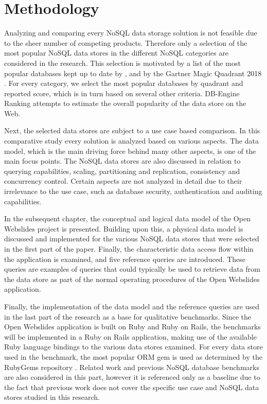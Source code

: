 
\chapter{Methodology}
\label{ch:methodology}

Analyzing and comparing every NoSQL data storage solution is not feasible due to the sheer number of competing products.
Therefore only a selection of the most popular NoSQL data stores in the different NoSQL categories are considered in the research.
This selection is motivated by a list of the most popular databases kept up to date by \textcite{DBEngine2018}, and by the Gartner Magic Quadrant 2018 \autocite{Gartner2018}.
For every category, we select the most popular databases by quadrant and reported score, which is in turn based on several other criteria.
DB-Engine Ranking attempts to estimate the overall popularity of the data store on the Web.

Next, the selected data stores are subject to a use case based comparison.
In this comparative study every solution is analyzed based on various aspects.
The data model, which is the main driving force behind many other aspects, is one of the main focus points.
The NoSQL data stores are also discussed in relation to querying capabilities, scaling, partitioning and replication, consistency and concurrency control.
Certain aspects are not analyzed in detail due to their irrelevance to the use case, such as database security, authentication and auditing capabilities.

In the subsequent chapter, the conceptual and logical data model of the Open Webslides project is presented.
Building upon this, a physical data model is discussed and implemented for the various NoSQL data stores that were selected in the first part of the paper.
Finally, the characteristic data access flow within the application is examined, and five reference queries are introduced.
These queries are examples of queries that could typically be used to retrieve data from the data store as part of the normal operating procedures of the Open Webslides application.

Finally, the implementation of the data model and the reference queries are used in the last part of the research as a base for qualitative benchmarks.
Since the Open Webslides application is built on Ruby and Ruby on Rails, the benchmarks will be implemented in a Ruby on Rails application, making use of the available Ruby language bindings to the various data stores examined.
For every data store used in the benchmark, the most popular ORM gem is used as determined by the RubyGems repository \autocite{RubyGems2003}.
Related work and previous NoSQL database benchmarks are also considered in this part, however it is referenced only as a baseline due to the fact that previous work does not cover the specific use case and NoSQL data stores studied in this research.
